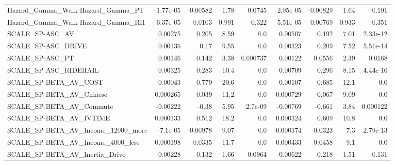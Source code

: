 \begin{tabular}{lrrrrrrrr}
Hazard\_Gamma\_Walk-Hazard\_Gamma\_PT                  &   -1.77e-05 &     -0.00582 &     1.78 &   0.0745 &  -2.95e-05 &    -0.00829 &         1.64 &         0.101 \\
Hazard\_Gamma\_Walk-Hazard\_Gamma\_RH                  &   -6.37e-05 &      -0.0103 &    0.991 &    0.322 &  -5.51e-05 &    -0.00769 &        0.933 &         0.351 \\
SCALE\_SP-ASC\_AV                                    &     0.00275 &        0.205 &     8.59 &      0.0 &    0.00507 &       0.192 &         7.01 &      2.33e-12 \\
SCALE\_SP-ASC\_DRIVE                                 &     0.00136 &         0.17 &     9.55 &      0.0 &    0.00323 &       0.209 &         7.52 &      5.51e-14 \\
SCALE\_SP-ASC\_PT                                    &     0.00146 &        0.142 &     3.38 & 0.000737 &    0.00122 &      0.0556 &         2.39 &        0.0168 \\
SCALE\_SP-ASC\_RIDEHAIL                              &     0.00325 &        0.283 &     10.4 &      0.0 &    0.00709 &       0.296 &         8.15 &      4.44e-16 \\
SCALE\_SP-BETA\_AV\_COST                              &     0.00043 &        0.779 &     20.6 &      0.0 &    0.00107 &       0.685 &         12.1 &           0.0 \\
SCALE\_SP-BETA\_AV\_Chinese                           &    0.000265 &        0.039 &     11.2 &      0.0 &   0.000729 &       0.067 &         9.09 &           0.0 \\
SCALE\_SP-BETA\_AV\_Commute                           &    -0.00222 &        -0.38 &     5.95 &  2.7e-09 &   -0.00769 &      -0.661 &         3.84 &      0.000122 \\
SCALE\_SP-BETA\_AV\_IVTIME                            &    0.000133 &        0.512 &     18.2 &      0.0 &   0.000324 &       0.609 &         10.8 &           0.0 \\
SCALE\_SP-BETA\_AV\_Income\_12000\_more                 &    -7.1e-05 &     -0.00978 &     9.07 &      0.0 &  -0.000374 &     -0.0323 &          7.3 &      2.79e-13 \\
SCALE\_SP-BETA\_AV\_Income\_4000\_less                  &    0.000198 &       0.0335 &     11.7 &      0.0 &   0.000433 &      0.0458 &          9.1 &           0.0 \\
SCALE\_SP-BETA\_AV\_Inertia\_Drive                     &    -0.00228 &       -0.132 &     1.66 &   0.0964 &   -0.00622 &      -0.218 &         1.51 &         0.131 \\

\end{tabular}
